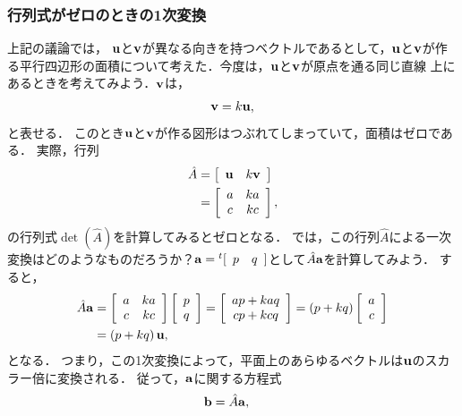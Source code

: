 \subsubsection{行列式がゼロのときの1次変換\label{sec:linear_trans_det0_2d}}
%
上記の議論では，
${\bf u}$と${\bf v}$が異なる向きを持つベクトルであるとして，${\bf u}$と${\bf v}$が作る平行四辺形の面積について考えた．今度は，${\bf u}$と${\bf v}$が原点を通る同じ直線
上にあるときを考えてみよう．${\bf v}$は，
\begin{align}
 {\bf v} = k {\bf u}, 
\end{align}
と表せる．
このとき${\bf u}$と${\bf v}$が作る図形はつぶれてしまっていて，面積はゼロである．
実際，行列
\begin{align}
\hat{A} & =\left[\begin{array}{cc}
{\bf u} & k{\bf v}\end{array}\right]\notag\\
 & =\left[\begin{array}{cc}
a & ka\\
c & kc
\end{array}\right], 
\end{align}
の行列式$\det(\hat{A})$を計算してみるとゼロとなる．
では，この行列$\hat{A}$による一次変換はどのようなものだろうか？${\bf a}={}^{t}[\begin{array}{cc} p & q\end{array}]$として$\hat{A}{\bf a}$を計算してみよう．
すると，
\begin{align}
\hat{A}{\bf a} & =\left[\begin{array}{cc}
a & ka\\
c & kc
\end{array}\right]\left[\begin{array}{c}
p\\
q
\end{array}\right]=\left[\begin{array}{c}
ap+kaq\\
cp+kcq
\end{array}\right]
=\left(p+kq\right)\left[\begin{array}{c}
a\\
c
\end{array}\right] \notag \\
&= \left(p+kq\right){\bf u}, 
\end{align}
となる．
つまり，この1次変換によって，平面上のあらゆるベクトルは${\bf u}$のスカラー倍に変換される．
従って，${\bf a}$に関する方程式
\begin{align}
{\bf b} & =\hat{A}{\bf a}, \label{LA:b=Aa_det0}
\end{align}
